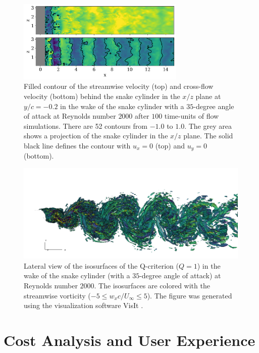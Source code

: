 \documentclass[10pt,journal,compsoc]{IEEEtran}
\begin{document}
\begin{figure}
    \centering
    \includegraphics[width=8cm]{figures/ux_uy_xz_plane.png}
    \caption{Filled contour of the streamwise velocity (top) and cross-flow velocity (bottom) behind the snake cylinder in the $x/z$ plane at $y/c=-0.2$ in the wake of the snake cylinder with a $35$-degree angle of attack at Reynolds number $2000$ after $100$ time-units of flow simulations. There are 52 contours from $-1.0$ to $1.0$. The grey area shows a projection of the snake cylinder in the $x/z$ plane. The solid black line defines the contour with $u_x = 0$ (top) and $u_y = 0$ (bottom).}
    \label{fig:ux_uy_xz_plane_3d}
\end{figure}

\begin{figure}[!h]
    \centering
    \includegraphics[width=18cm]{figures/qcrit_wx_wake3d_0020.png}
    \caption{Lateral view of the isosurfaces of the Q-criterion ($Q = 1$) in the wake of the snake cylinder (with a $35$-degree angle of attack) at Reynolds number $2000$. The isosurfaces are colored with the streamwise vorticity ($-5 \leq w_x c / U_\infty \leq 5$). The figure was generated using the visualization software VisIt \cite{childs_et_al_2012}.}
    \label{fig:qcrit_wx_3d}
\end{figure}

\section{Cost Analysis and User Experience}\label{sec:cost}
\end{document}
